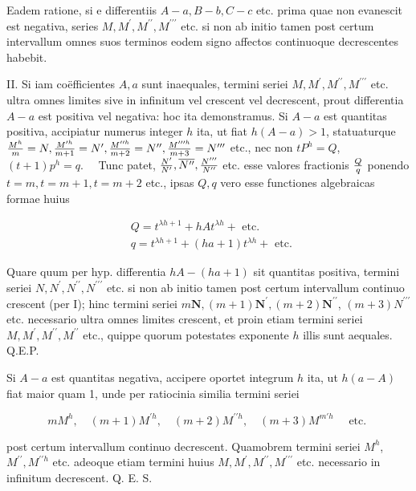\documentclass[twoside,12pt, showframe]{memoir}
\let\oldfrac\frac
\def\frac#1#2{\mathchoice{\tfrac{#1}{#2}}{\oldfrac{#1}{#2}}{\genfrac{}{}{}{2}{#1}{#2\mathstrut}}{\genfrac{}{}{}{3}{#1}{#2\mathstrut}}}
\begin{document}
Eadem ratione, si e differentiis \(A-a, B-b, C-c\) etc. prima quae non evanescit est negativa, series \(M, M^{\prime}, M^{\prime \prime}, M^{\prime \prime \prime}\) etc. si non ab initio tamen post certum intervallum omnes suos terminos eodem signo affectos continuoque decrescentes habebit.

II. Si iam coëfficientes \(A, a\) sunt inaequales, termini seriei \(M, M^{\prime}, M^{\prime \prime}, M^{\prime \prime \prime}\) etc. ultra omnes limites sive in infinitum vel crescent vel decrescent, prout differentia \(A-a\) est positiva vel negativa: hoc ita demonstramus. Si \(A-a\) est quantitas positiva, accipiatur numerus integer \(h\) ita, ut fiat \(h(A-a)>1\), statuaturque \(\frac{M^{h}}{m}=N, \frac{M^{\prime h}}{m+1}=N^{\prime}, \frac{M^{\prime \prime h}}{m+2}=N^{\prime \prime}, \frac{M^{\prime \prime \prime h}}{m+3}=N^{\prime \prime \prime}\) etc., nec non \(t P^{h}=Q\), \((t+1) p^{h}=q . \quad\) Tunc patet, \(\frac{N^{\prime}}{N^{\prime}}, \overline{N^{\prime \prime}}, \frac{N^{\prime \prime \prime}}{N^{\prime \prime}}\) etc. esse valores fractionis \(\frac{Q}{q}\) ponendo \(t=m, t=m+1, t=m+2\) etc., ipsas \(Q, q\) vero esse functiones algebraicas formae huius

\[
\begin{aligned}
& Q=t^{\lambda h+1}+h A t^{\lambda h}+\text { etc. } \\
& q=t^{\lambda h+1}+(h a+1) t^{\lambda h}+\text { etc. }
\end{aligned}
\]

Quare quum per hyp. differentia \(h A-(h a+1)\) sit quantitas positiva, termini seriei \(N, N^{\prime}, N^{\prime \prime}, N^{\prime \prime \prime}\) etc. si non ab initio tamen post certum intervallum continuo crescent (per I); hinc termini seriei \(m \boldsymbol{N},(m+1) \boldsymbol{N}^{\prime},(m+2) \boldsymbol{N}^{\prime \prime}\), \((m+3) N^{\prime \prime \prime}\) etc. necessario ultra omnes limites crescent, et proin etiam termini seriei \(M, M^{\prime}, M^{\prime \prime}, M^{\prime \prime}\) etc., quippe quorum potestates exponente \(h\) illis sunt aequales. Q.E.P.

Si \(A-a\) est quantitas negativa, accipere oportet integrum \(h\) ita, ut \(h(a-A)\) fiat maior quam 1, unde per ratiocinia similia termini seriei

\[
m M^{h}, \quad(m+1) M^{\prime h}, \quad(m+2) M^{\prime \prime h}, \quad(m+3) M^{m \prime h} \quad \text { etc. }
\]

post certum intervallum continuo decrescent. Quamobrem termini seriei \(M^{h}\), \(M^{\prime \prime}, M^{\prime \prime h}\) etc. adeoque etiam termini huius \(M, M^{\prime}, M^{\prime \prime}, M^{\prime \prime \prime}\) etc. necessario in infinitum decrescent. Q. E. S.
\end{document}
